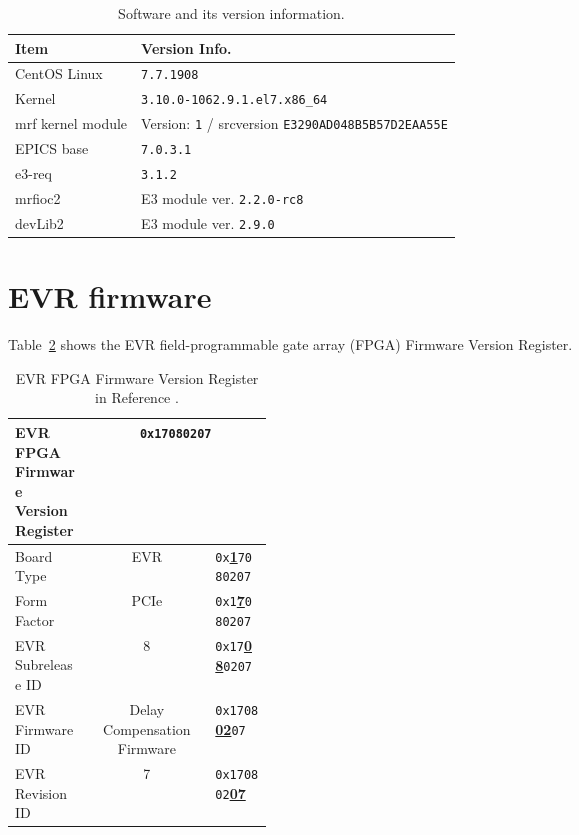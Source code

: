 \documentclass[11pt
  , a4paper
  , article
  , oneside
  , showtrims
]{memoir}
\begin{document}
\begin{table}[!htb]
  \centering
  \begin{tabular}{l|l}
    \toprule
    Item               & Version Info.                                                       \\\midrule
    CentOS Linux       & \texttt{7.7.1908}                                                  \\\midrule
    Kernel             & \texttt{3.10.0-1062.9.1.el7.x86\_64}                               \\\midrule
    mrf kernel module  & Version: \texttt{1} / srcversion \texttt{E3290AD048B5B57D2EAA55E}  \\\midrule
    EPICS base         & \texttt{7.0.3.1}                                                   \\\midrule
    e3-req             & \texttt{3.1.2}                                                     \\\midrule
    mrfioc2            & E3 module ver. \texttt{2.2.0-rc8}                                  \\\midrule
    devLib2            & E3 module ver. \texttt{2.9.0}                                      \\\bottomrule
  \end{tabular}
  \caption[]{Software and its version information.}
  \label{table:swlist}
\end{table}

\section{EVR firmware}
Table~\ref{table:fwinfo} shows the EVR field-programmable gate array (FPGA) Firmware Version Register.

\begin{table}[!htb]
  \centering
  \begin{tabular}{p{0.3\linewidth}|c|l}
    \toprule
    EVR FPGA Firmware Version Register              & \multicolumn{2}{c}{\texttt{0x17080207}}             \\\midrule
    Board Type        & EVR                         &  \texttt{0x}\underline{\textbf{1}}\texttt{7080207}  \\\midrule
    Form Factor       & PCIe                        &  \texttt{0x1}\underline{\textbf{7}}\texttt{080207}  \\\midrule
    EVR Subrelease ID & 8                           &  \texttt{0x17}\underline{\textbf{08}}\texttt{0207}  \\\midrule
    EVR Firmware ID   & Delay Compensation Firmware &  \texttt{0x1708}\underline{\textbf{02}}\texttt{07}  \\\midrule
    EVR Revision ID   & 7                           &  \texttt{0x170802}\underline{\textbf{07}}           \\\bottomrule
  \end{tabular}
  \caption[]{EVR FPGA Firmware Version Register in Reference \citep[see][p66]{MRFEVENTSYSTEMDC}.}
  \label{table:fwinfo}
\end{table}
\end{document}
